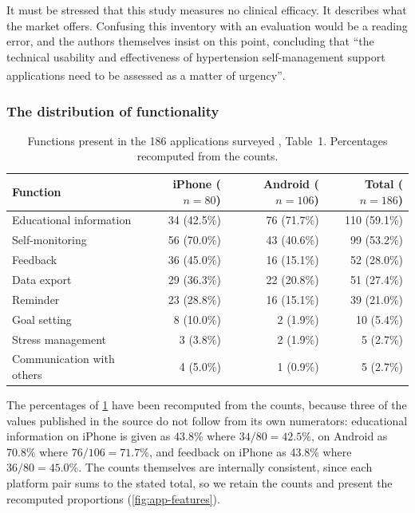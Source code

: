 \documentclass[12pt,a4paper,oneside]{report}
\newcommand{\bq}[1]{``#1''\textsuperscript{\dag}}
\begin{document}
It must be stressed that this study measures no clinical efficacy. It describes what the market offers. Confusing this inventory with an evaluation would be a reading error, and the authors themselves insist on this point, concluding that \bq{the technical usability and effectiveness of hypertension self-management support applications need to be assessed as a matter of urgency}.

\subsubsection{The distribution of functionality}

\begin{table}[htbp]
\centering\small
\caption{Functions present in the 186 applications surveyed \parencite{alessa2019}, Table~1. Percentages recomputed from the counts.}\label{tab:app-features}
\begin{tabularx}{\textwidth}{@{}X r r r@{}}
\toprule
\textbf{Function} & \textbf{iPhone ($n=80$)} & \textbf{Android ($n=106$)} & \textbf{Total ($n=186$)} \\
\midrule
Educational information & 34 (42.5\%) & 76 (71.7\%) & 110 (59.1\%) \\
Self-monitoring & 56 (70.0\%) & 43 (40.6\%) & 99 (53.2\%) \\
Feedback & 36 (45.0\%) & 16 (15.1\%) & 52 (28.0\%) \\
Data export & 29 (36.3\%) & 22 (20.8\%) & 51 (27.4\%) \\
Reminder & 23 (28.8\%) & 16 (15.1\%) & 39 (21.0\%) \\
Goal setting & 8 (10.0\%) & 2 (1.9\%) & 10 (5.4\%) \\
Stress management & 3 (3.8\%) & 2 (1.9\%) & 5 (2.7\%) \\
Communication with others & 4 (5.0\%) & 1 (0.9\%) & 5 (2.7\%) \\
\bottomrule
\end{tabularx}
\end{table}

The percentages of \cref{tab:app-features} have been recomputed from the counts, because three of the values published in the source do not follow from its own numerators: educational information on iPhone is given as 43.8\% where $34/80 = 42.5\%$, on Android as 70.8\% where $76/106 = 71.7\%$, and feedback on iPhone as 43.8\% where $36/80 = 45.0\%$. The counts themselves are internally consistent, since each platform pair sums to the stated total, so we retain the counts and present the recomputed proportions (\cref{fig:app-features}).
\end{document}
